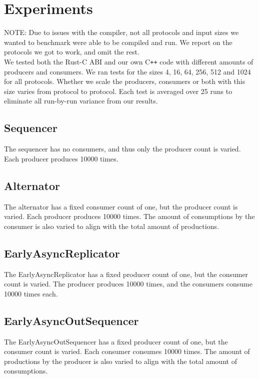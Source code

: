 \section{Experiments}
NOTE: Due to issues with the compiler, not all protocols and input sizes we wanted to benchmark were able to be compiled and run. We report on the protocols we got to work, and omit the rest. \\

\noindent We tested both the Rust-C ABI and our own C\texttt{++} code with different amounts of producers and consumers. We ran tests for the sizes 4, 16, 64, 256, 512 and 1024 for all protocols. Whether we scale the producers, consumers or both with this size varies from protocol to protocol. Each test is averaged over 25 runs to eliminate all run-by-run variance from our results.

\subsection{Sequencer}
The sequencer has no consumers, and thus only the producer count is varied. Each producer produces 10000 times.

\subsection{Alternator}
The alternator has a fixed consumer count of one, but the producer count is varied. Each producer produces 10000 times. The amount of consumptions by the consumer is also varied to align with the total amount of productions.

\subsection{EarlyAsyncReplicator}
The EarlyAsyncReplicator has a fixed producer count of one, but the consumer count is varied. The producer produces 10000 times, and the consumers consume 10000 times each.

\subsection{EarlyAsyncOutSequencer}
The EarlyAsyncOutSequencer has a fixed producer count of one, but the consumer count is varied. Each consumer consumes 10000 times. The amount of productions by the producer is also varied to align with the total amount of consumptions.
